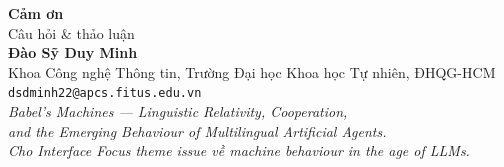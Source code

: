 \documentclass[11pt,aspectratio=169]{beamer}
\begin{document}
\begin{frame}
    \begin{center}
        \Huge \textcolor{rsnavy}{\textbf{Cảm ơn}} \\[0.6cm]
        \large Câu hỏi \& thảo luận \\[0.8cm]
        \normalsize
        \textbf{Đào Sỹ Duy Minh}\\
        Khoa Công nghệ Thông tin, Trường Đại học Khoa học Tự nhiên, ĐHQG-HCM\\
        \texttt{dsdminh22@apcs.fitus.edu.vn}\\[0.8cm]
        \scriptsize\itshape Babel's Machines --- Linguistic Relativity, Cooperation,\\and the Emerging Behaviour of Multilingual Artificial Agents.\\
        Cho Interface Focus theme issue về machine behaviour in the age of LLMs.
    \end{center}
\end{frame}
\end{document}

